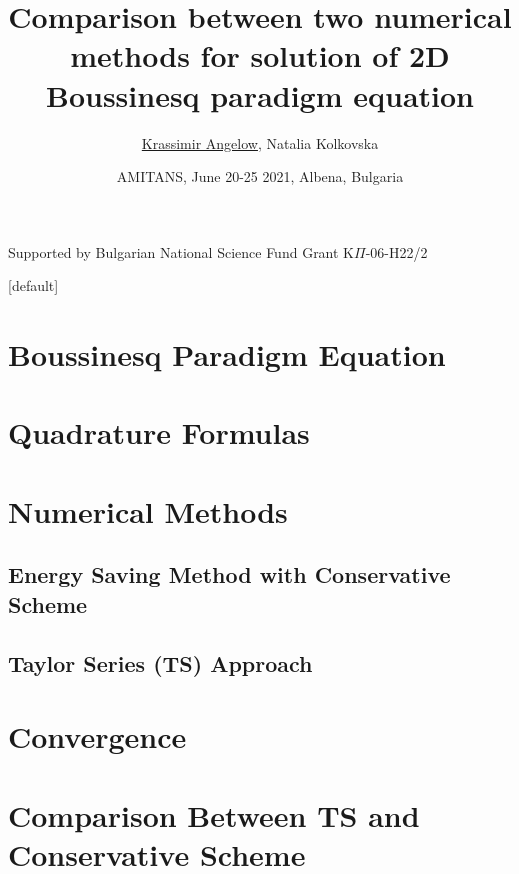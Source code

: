 \documentclass{beamer}
\begin{document}
\title{Comparison between two numerical methods for solution of 2D Boussinesq paradigm equation}

\author[K. Angelow]{{\underline{Krassimir Angelow}}, Natalia Kolkovska}
\date[2021]{AMITANS, June 20-25  2021,  Albena, Bulgaria}


\begin{frame}
 \titlepage
 \begin{center}
  Supported by Bulgarian National Science Fund Grant K$\Pi$-06-H22/2
  \end{center}
\end{frame}

\begin{frame}
\tableofcontents 
{}[default]
\section{Boussinesq Paradigm Equation}
\section{Quadrature Formulas}
\section{Numerical Methods}
\subsection{Energy Saving Method with Conservative Scheme}
\subsection{Taylor Series (TS) Approach}
\section{Convergence}

\section{Comparison Between TS and Conservative Scheme}
\end{frame}
\end{document}
